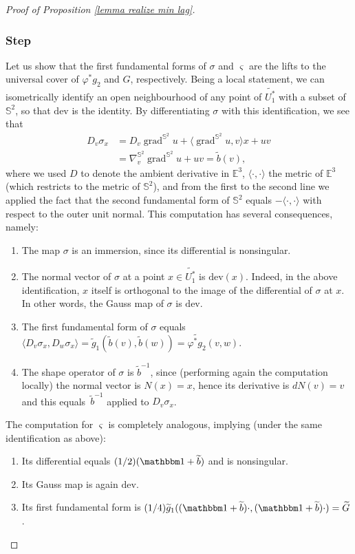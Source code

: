 \documentclass[JEP,XML,SOM,Unicode,NoEqCountersInSection,published]{cedram}
\newcounter{steps}
\newcommand{\step}{\refstepcounter{steps}\subsubsection*{Step \thesteps}}
\theoremstyle{definition}
\newcommand{\E}{\mathbb{E}}
\newcommand{\dev}{\mathrm{dev}}
\DeclareMathOperator{\grad}{grad}
\begin{document}
\begin{proof}[Proof of Proposition \ref{lemma realize min lag}]
\step\label{step:1}
Let us show that the first fundamental forms of $\sigma$ and $ \varsigma$ are the lifts to the universal cover of $\varphi^*g_2$ and $G$, respectively.
Being a local statement, we can isometrically identify an open neighbourhood of any point of $\widetilde {U_1^*}$ with a subset of $\mathbb S^2$, so that $\dev$ is the identity. By differentiating $\sigma$ with this identification, we see that
\begin{align*}
D_v \sigma_x&=D_v\grad^{\mathbb S^2}\!\! u+\langle \grad^{\mathbb S^2}\!\!u,v\rangle x+uv \\
&=\nabla^{\mathbb S^2}_v\!\grad^{\mathbb S^2}\!\! u+uv=\widetilde b(v),
\end{align*}
where we used $D$ to denote the ambient derivative in $\E^3$, $\langle\cdot,\cdot\rangle$ the metric of $\E^3$ (which restricts to the metric of $\mathbb S^2$), and from the first to the second line we applied the fact that the second fundamental form of $\mathbb S^2$ equals $-\langle\cdot,\cdot\rangle$ with respect to the outer unit normal. This computation has several consequences, namely:
\begin{enumerate}
\item\label{enum:1} The map $ \sigma$ is an immersion, since its differential is nonsingular.
\item\label{enum:2} The normal vector of $ \sigma$ at a point $x\in \widetilde{U_1^*}$ is $\dev(x)$. Indeed, in the above identification, $x$ itself is orthogonal to the image of the differential of $\sigma$ at $x$. In other words, the Gauss map of $ \sigma$ is $\dev$.
\item\label{enum:3} The first fundamental form of $ \sigma$ equals
$\langle D_v\sigma_x,D_w\sigma_x\rangle=\widetilde g_1( \widetilde b(v),\widetilde b(w))=\widetilde{\varphi^*g_2}(v,w)$.
\item\label{enum:4} The shape operator of $ \sigma$ is $\widetilde b^{-1}$, since (performing again the computation local\-ly) the normal vector is $N(x)=x$, hence its derivative is $dN(v)=v$ and this equals~$\widetilde b^{-1}$ applied to $D_v\sigma_x$.
\end{enumerate}
The computation for $\varsigma$ is completely analogous, implying (under the same identification as above):
\begin{enumerate}\renewcommand{\theenumi}{\arabic{enumi}$'$}
\item\label{enum:1'}
Its differential equals $(1/2)(\mathbbm 1+\widetilde b)$ and is nonsingular.
\item\label{enum:2'}
Its Gauss map is again $\dev$.
\item\label{enum:3'}
Its first fundamental form is $(1/4)\widetilde g_1((\mathbbm 1+ \widetilde b)\cdot,(\mathbbm 1+ \widetilde b)\cdot)=\widetilde G$.
\end{enumerate}


\end{proof}
\end{document}
